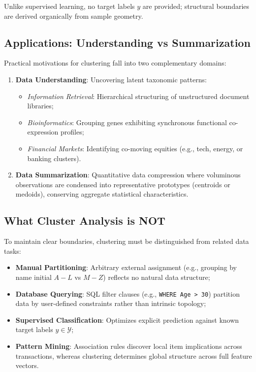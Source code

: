 Unlike supervised learning, no target labels $y$ are provided; structural boundaries are derived organically from sample geometry.

\subsection{Applications: Understanding vs Summarization}
Practical motivations for clustering fall into two complementary domains:
\begin{enumerate}
    \item \textbf{Data Understanding}: Uncovering latent taxonomic patterns:
    \begin{itemize}[noitemsep]
        \item \textit{Information Retrieval}: Hierarchical structuring of unstructured document libraries;
        \item \textit{Bioinformatics}: Grouping genes exhibiting synchronous functional co-expression profiles;
        \item \textit{Financial Markets}: Identifying co-moving equities (e.g., tech, energy, or banking clusters).
    \end{itemize}
    \item \textbf{Data Summarization}: Quantitative data compression where voluminous observations are condensed into representative prototypes (centroids or medoids), conserving aggregate statistical characteristics.
\end{enumerate}

\subsection{What Cluster Analysis is NOT}
To maintain clear boundaries, clustering must be distinguished from related data tasks:
\begin{itemize}
    \item \textbf{Manual Partitioning}: Arbitrary external assignment (e.g., grouping by name initial $A-L$ vs $M-Z$) reflects no natural data structure;
    \item \textbf{Database Querying}: SQL filter clauses (e.g., \texttt{WHERE Age > 30}) partition data by user-defined constraints rather than intrinsic topology;
    \item \textbf{Supervised Classification}: Optimizes explicit prediction against known target labels $y \in \mathcal{Y}$;
    \item \textbf{Pattern Mining}: Association rules discover local item implications across transactions, whereas clustering determines global structure across full feature vectors.
\end{itemize}


